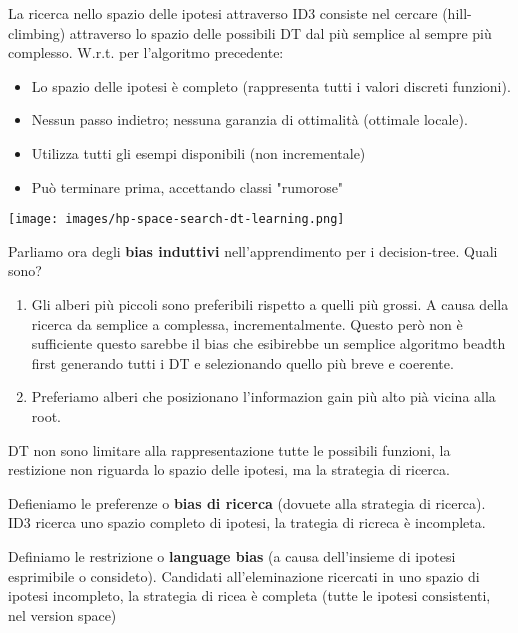 La ricerca nello spazio delle ipotesi attraverso ID3 consiste nel cercare (hill-climbing) attraverso lo spazio delle possibili
DT dal più semplice al sempre più complesso. W.r.t. per l'algoritmo precedente:
\begin{minipage}{.6\linewidth}
    \begin{itemize}
        \item Lo spazio delle ipotesi è completo (rappresenta tutti i valori discreti funzioni).
        \item Nessun passo indietro; nessuna garanzia di ottimalità (ottimale locale).
        \item Utilizza tutti gli esempi disponibili (non incrementale)
        \item Può terminare prima, accettando classi "rumorose"
    \end{itemize}
\end{minipage}
\hfill
\begin{minipage}{.4\linewidth}
    \centering
    \texttt{[image: images/hp-space-search-dt-learning.png]}
\end{minipage}
Parliamo ora degli \textbf{bias induttivi} nell'apprendimento per i decision-tree. Quali sono?
\begin{enumerate}
    \item Gli alberi più piccoli sono preferibili rispetto a quelli più grossi. A causa della ricerca da semplice a complessa, incrementalmente.
    Questo però non è sufficiente questo sarebbe il bias che esibirebbe un semplice algoritmo beadth first generando tutti i DT e selezionando quello più breve e coerente.
    \item Preferiamo alberi che posizionano l'informazion gain più alto pià vicina alla root.
\end{enumerate}
\begin{note}
    DT non sono limitare alla rappresentazione tutte le possibili funzioni, la restizione non riguarda lo spazio delle ipotesi, ma la strategia di ricerca.
\end{note}
\begin{definition}
    Defieniamo le preferenze o \textbf{bias di ricerca} (dovuete alla strategia di ricerca). ID3 ricerca uno spazio completo di ipotesi, la trategia
    di ricreca è incompleta.
\end{definition}
\begin{definition}
    Definiamo le restrizione o \textbf{language bias} (a causa dell'insieme di ipotesi esprimibile o consideto). Candidati all'eleminazione ricercati in uno spazio di ipotesi
    incompleto, la strategia di ricea è completa (tutte le ipotesi consistenti, nel version space)
\end{definition}
